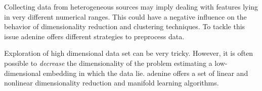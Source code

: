 \documentclass[twoside,11pt]{article}
\makeatletter
\newcommand{\ade}{{\sc adenine}\@\xspace}
\makeatother
\begin{document}
  Collecting data from heterogeneous sources may imply dealing with features lying in very different numerical ranges. This could have a negative influence on the behavior of dimensionality reduction and clustering techniques. To tackle this issue \ade offers different strategies to preprocess data.

  Exploration of high dimensional data set can be very tricky.
  However, it is often possible to \emph{decrease} the dimensionality of the problem estimating a low-dimensional embedding in which the data lie. %
  \ade offers a set of linear and nonlinear dimensionality reduction and manifold learning algorithms.%
\end{document}
